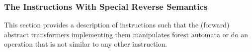\subsubsection{The Instructions With Special Reverse Semantics}

This section provides a description of instructions such that
the (forward) abstract transformers implementing them manipulates forest automata or do an operation that
is not similar to any other instruction.


